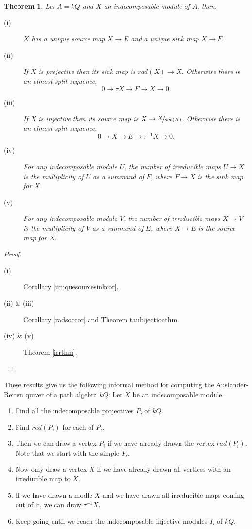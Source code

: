 \documentclass[11.5pt, twoside, a4paper, titlepage]{report}
\theoremstyle{definition}
\theoremstyle{plain}
\newtheorem{thm}[mydef]{Theorem}
\begin{document}
\begin{thm}
Let $A=kQ$ and $X$ an indecomposable module of $A$, then:
\begin{description}
\item [(i)] $X$ has a unique source map $X \to E$ and a unique sink map $X\to F$.
\item [(ii)] If $X$ is projective then its sink map is $rad(X) \to X$. Otherwise there is an almost-split sequence, 
\begin{equation*}
0 \to \tau X \to F \to X \to 0.
\end{equation*}
\item [(iii)] If $X$ is injective then its source map is $X \to \sfrac{X}{soc(X)}$. Otherwise there is an almost-split sequence, 
\begin{equation*}
0 \to X \to E \to \tau^{-1}X \to 0.
\end{equation*}
\item [(iv)] For any indecomposable module $U$, the number of irreducible maps $U \to X$ is the multiplicity of $U$ as a summand of $F$, where $F \to X$ is the sink map for $X$.
\item [(v)] For any indecomposable module $V$, the number of irreducible maps $X \to V$ is the multiplicity of $V$ as a summand of $E$, where $X \to E$ is the source map for $X$.
\end{description}
\end{thm}
\begin{proof}
\begin{description}
\item [(i)] Corollary \ref{uniquesourcesinkcor}.
\item [(ii) \& (iii)] Corollary \ref{radsoccor} and Theorem {taubijectionthm}.
\item [(iv) \& (v)] Theorem \ref{irrthm}.
\end{description}
\end{proof}

These results give us the following informal method for computing the Auslander-Reiten quiver of a path algebra $kQ$: Let $X$ be an indecomposable module.
\begin{enumerate}
\item Find all the indecomposable projectives $P_i$ of $kQ$.
\item Find $rad(P_i)$ for each of $P_i$.
\item Then we can draw a vertex $P_i$ if we have already drawn the vertex $rad(P_i)$. Note that we start with the simple $P_i$.
\item Now only draw a vertex $X$ if we have already drawn all vertices with an irreducible map to $X$.
\item If we have drawn a modle $X$ and we have drawn all irreducible maps coming out of it, we can draw $\tau^{-1}X$.
\item Keep going until we reach the indecomposable injective modules $I_i$ of $kQ$.
\end{enumerate}
\end{document}

